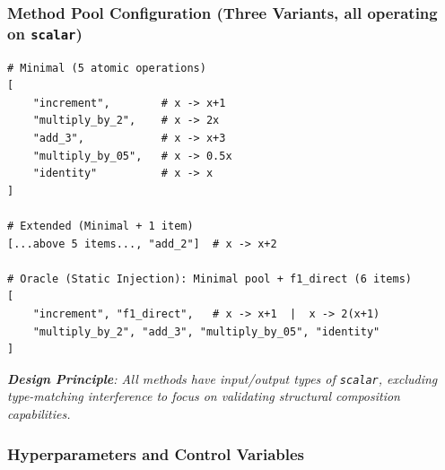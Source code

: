 \subsubsection{Method Pool Configuration (Three Variants, all operating on \texttt{scalar})}
\begin{lstlisting}[style=plaincode]
# Minimal (5 atomic operations)
[
    "increment",        # x -> x+1
    "multiply_by_2",    # x -> 2x
    "add_3",            # x -> x+3
    "multiply_by_05",   # x -> 0.5x
    "identity"          # x -> x
]

# Extended (Minimal + 1 item)
[...above 5 items..., "add_2"]  # x -> x+2

# Oracle (Static Injection): Minimal pool + f1_direct (6 items)
[
    "increment", "f1_direct",   # x -> x+1  |  x -> 2(x+1)
    "multiply_by_2", "add_3", "multiply_by_05", "identity"
]
\end{lstlisting}

\textit{\textbf{Design Principle}: All methods have input/output types of \texttt{scalar}, excluding type-matching interference to focus on validating structural composition capabilities.}

\subsubsection{Hyperparameters and Control Variables}
\begin{table}[htbp]
    \centering
    \caption{Hyperparameters and Control Variables}
    \label{tab:hyperparams_exp2}
\end{table}

